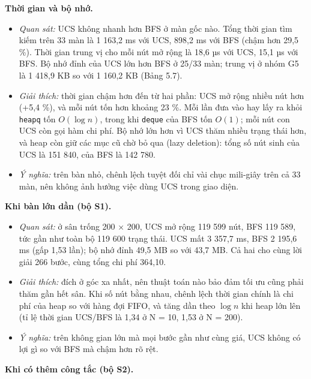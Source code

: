 \textbf{Thời gian và bộ nhớ.}

\begin{itemize}
\tightlist
\item
  \emph{Quan sát:} UCS không nhanh hơn BFS ở màn gốc nào. Tổng thời gian tìm kiếm trên 33 màn là 1 163,2 ms với UCS, 898,2 ms với BFS (chậm hơn 29,5 \%). Thời gian trung vị cho mỗi nút mở rộng là 18,6 µs với UCS, 15,1 µs với BFS. Bộ nhớ đỉnh của UCS lớn hơn BFS ở 25/33 màn; trung vị ở nhóm G5 là 1 418,9 KB so với 1 160,2 KB (Bảng 5.7).
\item
  \emph{Giải thích:} thời gian chậm hơn đến từ hai phần: UCS mở rộng nhiều nút hơn (+5,4 \%), và mỗi nút tốn hơn khoảng 23 \%. Mỗi lần đưa vào hay lấy ra khỏi \texttt{heapq} tốn \(O(\log n)\), trong khi \texttt{deque} của BFS tốn \(O(1)\); mỗi nút con UCS còn gọi hàm chi phí. Bộ nhớ lớn hơn vì UCS thăm nhiều trạng thái hơn, và heap còn giữ các mục cũ chờ bỏ qua (lazy deletion): tổng số nút sinh của UCS là 151 840, của BFS là 142 780.
\item
  \emph{Ý nghĩa:} trên bàn nhỏ, chênh lệch tuyệt đối chỉ vài chục mili-giây trên cả 33 màn, nên không ảnh hưởng việc dùng UCS trong giao diện.
\end{itemize}

\textbf{Khi bàn lớn dần (bộ S1).}

\begin{itemize}
\tightlist
\item
  \emph{Quan sát:} ở sân trống 200 × 200, UCS mở rộng 119 599 nút, BFS 119 589, tức gần như toàn bộ 119 600 trạng thái. UCS mất 3 357,7 ms, BFS 2 195,6 ms (gấp 1,53 lần); bộ nhớ đỉnh 49,5 MB so với 43,7 MB. Cả hai cho cùng lời giải 266 bước, cùng tổng chi phí 364,10.
\item
  \emph{Giải thích:} đích ở góc xa nhất, nên thuật toán nào bảo đảm tối ưu cũng phải thăm gần hết sân. Khi số nút bằng nhau, chênh lệch thời gian chính là chi phí của heap so với hàng đợi FIFO, và tăng dần theo \(\log n\) khi heap lớn lên (tỉ lệ thời gian UCS/BFS là 1,34 ở N = 10, 1,53 ở N = 200).
\item
  \emph{Ý nghĩa:} trên không gian lớn mà mọi bước gần như cùng giá, UCS không có lợi gì so với BFS mà chậm hơn rõ rệt.
\end{itemize}

\textbf{Khi có thêm công tắc (bộ S2).}

